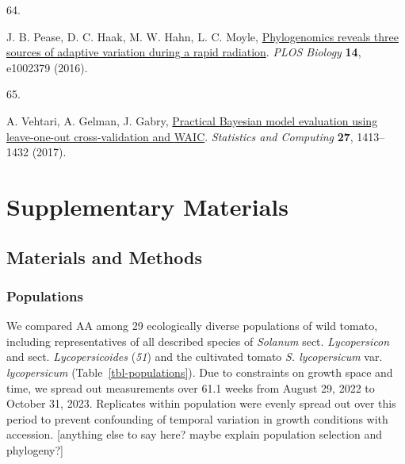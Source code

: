 \documentclass[
  letterpaper,
  DIV=11,
  numbers=noendperiod]{scrartcl}
\newlength{\cslhangindent}
\newlength{\csllabelwidth}
\newenvironment{CSLReferences}[2] %
 {\begin{list}{}{%
  \setlength{\itemindent}{0pt}
  \setlength{\leftmargin}{0pt}
  \setlength{\parsep}{0pt}
  \ifodd #1
   \setlength{\leftmargin}{\cslhangindent}
   \setlength{\itemindent}{-1\cslhangindent}
  \fi
  \setlength{\itemsep}{#2\baselineskip}}}
 {\end{list}}
\newcommand{\CSLLeftMargin}[1]{\parbox[t]{\csllabelwidth}{\strut#1\strut}}
\newcommand{\CSLRightInline}[1]{\parbox[t]{\linewidth - \csllabelwidth}{\strut#1\strut}}
\newcommand{\aax}{$\mathrm{AA}$}
\begin{document}
\begin{CSLReferences}{0}{1}
\CSLLeftMargin{64. }%
\CSLRightInline{J. B. Pease, D. C. Haak, M. W. Hahn, L. C. Moyle,
\href{https://doi.org/10.1371/journal.pbio.1002379}{Phylogenomics
reveals three sources of adaptive variation during a rapid radiation}.
\emph{PLOS Biology} \textbf{14}, e1002379 (2016).}

\CSLLeftMargin{65. }%
\CSLRightInline{A. Vehtari, A. Gelman, J. Gabry,
\href{https://doi.org/10.1007/s11222-016-9696-4}{Practical {Bayesian}
model evaluation using leave-one-out cross-validation and {WAIC}}.
\emph{Statistics and Computing} \textbf{27}, 1413--1432 (2017).}

\end{CSLReferences}

\newpage{}

\section{Supplementary Materials}\label{supplementary-materials}

\renewcommand{\thefigure}{S\arabic{figure}}
\renewcommand{\thetable}{S\arabic{table}}
\renewcommand{\theequation}{S\arabic{equation}}
\setcounter{figure}{0}
\setcounter{table}{0}
\setcounter{equation}{0}

\subsection{Materials and Methods}\label{sec-methods}

\subsubsection{Populations}\label{populations}

We compared \aax{} among 29 ecologically diverse populations of wild
tomato, including representatives of all described species of
\emph{Solanum} sect. \emph{Lycopersicon} and sect.
\emph{Lycopersicoides} (\emph{51}) and the cultivated tomato \emph{S.
lycopersicum} var. \emph{lycopersicum} (Table~\ref{tbl-populations}).
Due to constraints on growth space and time, we spread out measurements
over 61.1 weeks from August 29, 2022 to October 31, 2023. Replicates
within population were evenly spread out over this period to prevent
confounding of temporal variation in growth conditions with accession.
{[}anything else to say here? maybe explain population selection and
phylogeny?{]}
\end{document}
